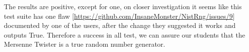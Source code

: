The results are positive, except for one, on closer investigation it seems like this test suite has one flaw [\href{https://github.com/InsaneMonster/NistRng/issues/9}{https://github.com/InsaneMonster/NistRng/issues/9}] documented by one of the users, after the change they suggested it works and outputs True. Therefore a success in all test, we can assure our students that the Mersenne Twister is a true random number generator.

